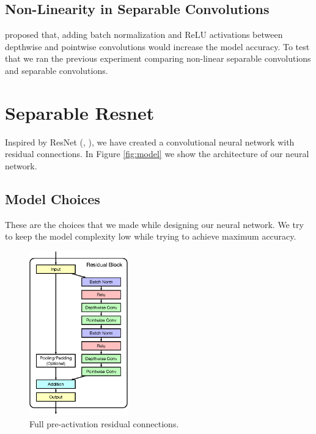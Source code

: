 \subsection{Non-Linearity in Separable Convolutions}
\cite{howard2017mobilenets} proposed that, adding batch normalization and ReLU activations between depthwise and pointwise convolutions would increase the model accuracy. To test that we ran the previous experiment comparing non-linear separable convolutions and separable convolutions.



\section{Separable Resnet}
Inspired by ResNet (\cite{He:2015aa}, \cite{he2016identity}), we have created a convolutional neural network with residual connections. In Figure \ref{fig:model} we show the architecture of our neural network. 


\subsection{Model Choices}
These are the choices that we made while designing our neural network. We try to keep the model complexity low while trying to achieve maximum accuracy.
\begin{figure}
\vspace{-65px}
\begin{center}
\includegraphics[width=0.38\textwidth]{images/full_preactivation.eps}
\end{center}
\caption{Full pre-activation residual connections.}
\label{fig:full-preactivation}
\end{figure}

